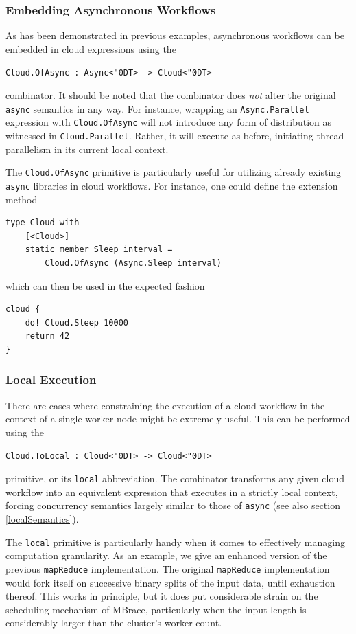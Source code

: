 \documentclass[9pt,a4paper]{article}
\newcommand{\mbrace}{MBrace}
\newcommand{\centertt}[1]{\begin{center}\texttt{#1}\end{center}}
\newcommand{\uq}{\char"0D}
\begin{document}
\subsubsection*{Embedding Asynchronous Workflows}

As has been demonstrated in previous examples, asynchronous workflows can be
embedded in cloud expressions using the
\centertt{Cloud.OfAsync : Async<\uq{}T> -> Cloud<\uq{}T>}
combinator. It should be noted that the combinator does \emph{not} alter the
original \texttt{async} semantics in any way. For instance, wrapping an
\texttt{Async.Parallel} expression with \texttt{Cloud.OfAsync} will not introduce
any form of distribution as witnessed in \texttt{Cloud.Parallel}. Rather,
it will execute as before, initiating thread parallelism in its current
local context.

The \texttt{Cloud.OfAsync} primitive is particularly useful for utilizing
already existing \texttt{async} libraries in cloud workflows. For instance,
one could define the extension method
\begin{lstlisting}
type Cloud with
    [<Cloud>]
    static member Sleep interval = 
    	Cloud.OfAsync (Async.Sleep interval)
\end{lstlisting}
which can then be used in the expected fashion
\begin{lstlisting}
cloud {
    do! Cloud.Sleep 10000
    return 42
}
\end{lstlisting}

\subsubsection*{Local Execution}
\label{localCombinator}

There are cases where constraining the execution of a cloud workflow in the context of a
single worker node might be extremely useful. This can be performed using the
\centertt{Cloud.ToLocal : Cloud<\uq{}T> -> Cloud<\uq{}T>}
primitive, or its \texttt{local} abbreviation. The combinator transforms any given
cloud workflow into an equivalent expression that executes in a strictly local context,
forcing concurrency semantics largely similar to those of \texttt{async} (see also section \ref{localSemantics}).

The \texttt{local} primitive is particularly handy when it comes to effectively managing 
computation granularity. As an example, we give an enhanced version of the previous 
\texttt{mapReduce} implementation. The original \texttt{mapReduce} implementation would 
fork itself on successive binary splits of the input data, until exhaustion thereof.
This works in principle, but it does put considerable strain on the scheduling mechanism of
\mbrace, particularly when the input length is considerably larger than the cluster's
worker count.
\end{document}
